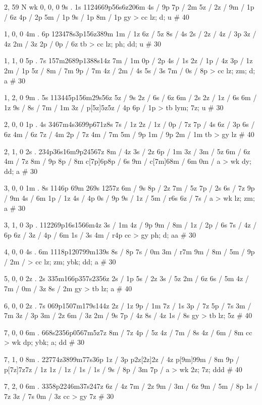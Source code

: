 2, 59
N
wk 
%
%
0, 0, 0
9s . 1s
1124669p56s6z206m
4s / 9p
7p / 2m 
5z / 
2z /
9m /
1p / 6z 
4p / 2p 
5m / 1p 
9s / 1p 
8m / 1p 
gy > cc
lz; d; u # 40

1, 0, 0
4m . 6p
123478s3p156z389m 
1m / 1z 
6z / 5z 
8s / 4s 
2s / 
2z / 
4z / 3p 
3z / 4z 
2m / 3z 
2p / 
0p / 6z 
tb > cc 
lz; ph; dd; u # 30 

1, 1, 0
5p . 7s
157m2689p1388s14z
7m / 1m 
0p / 2p 
4s / 1s 
2z / 
1p / 4z 
3p / 1z 
2m / 1p 
5z / 
8m / 7m 
9p / 7m 
4z / 
2m / 4s 
5s / 3s 
7m / 
0s / 8p 
> cc 
lz; zm; d; a # 30 

1, 2, 0
9m . 5s
113445p156m29s56z
5z / 9s 
2z / 
6s / 6z
6m / 2s 
2z / 
1z / 6s 
6m / 1z 
9s / 
8s / 
7m / 1m 
3z / 
p[5z]5z5z / 4p 
6p / 1p 
> tb 
lym; 7z; u # 30

2, 0, 0
1p . 4s
3467m4s3699p671z8s
7s / 1z 
2z / 
1z / 
0p / 7z 
7p / 4s 
6z / 3p 
6s / 6z 
4m / 6z 
7z / 4m 
2p / 7z 
4m / 7m 
5m / 9p 
1m / 9p 
2m / 1m 
tb > gy 
lz # 40 

2, 1, 0
2s . 
234p36s16m9p24567z
8m / 4z 
3s / 2z 
6p / 1m 
3z / 
3m / 5z 
6m / 6z 
4m / 7z 
8m / 9p 
8p / 8m 
c[7p]6p8p / 6s 
9m / 
c[7m]68m / 6m 
0m / a 
> wk 
dy; dd; a # 30 

3, 0, 0
1m . 8s
1146p 69m 269s 1257z 
6m / 9s 
8p / 2z 
7m / 5z 
7p / 2s 
6s / 7z 
9p / 9m
4s / 6m
1p / 1z 
4s / 4p 
0s / 9p 
9s / 
1z /
5m / r6s 
6z / 
7s / a 
> wk 
lz; zm; a # 30 

3, 1, 0
3p . 
112269p16s1566m4z 
3s / 1m 
4z / 9p 
9m / 
8m / 
1z / 
2p / 6s 
7s / 
4z / 6p 
6z / 
3z / 
4p / 6m 
1s / 3s 
4m / r4p 
cc > gy 
ph; d; aa # 30 

4, 0, 0
4s . 6m
1118p120799m139s
8s / 8p
7s / 0m 
3m / r7m 
9m / 
8m / 
5m / 
9p / 
2m / 
> cc
lz; zm; ybk; dd; a # 30

5, 0, 0
2z . 2s
335m166p357s2356z 
2s / 1p 
5s / 2z 
3s / 5z 
2m / 6z 
6s / 5m 
4z / 
7m / 
0m / 3z 
8s / 2m 
gy > tb 
lz; a # 40 

6, 0, 0 
2z . 7s
069p1507m179s144z 
2z / 1z 
9p / 1m 
7z / 1s 
3p / 7z 
5p / 7s 
3m / 7m 
3z / 3p 
3m / 2z 
6m / 3z 
2m / 9s 
7p / 4z 
8s / 4z 
1s / 8s 
gy > tb
lz; 5z # 40 

7, 0, 0
6m . 
668s2356p0567m5z7z
8m / 7z 
4p / 5z 
4z / 
7m / 8s 
4z / 
6m / 8m 
cc > wk 
dp; ybk; a; dd # 30 

7, 1, 0
8m . 
22774z3899m77s36p
1z / 3p 
p2z[2z]2z / 4z 
p[9m]99m / 8m 
9p / 
p[7z]7z7z / 1z 
1z / 
1z / 
1s / 
1s / 
9s / 
8p / 3m 
7p / a 
> wk 
2z; 7z; ddd # 40 

7, 2, 0
6m . 
3358p2246m37s247z 
6z / 4z 
7m / 2z 
9m /
3m / 6z 
9m / 
5m / 8p 
1s / 7z 
3z / 7s 
0m / 3z 
cc > gy 
7z # 30 


